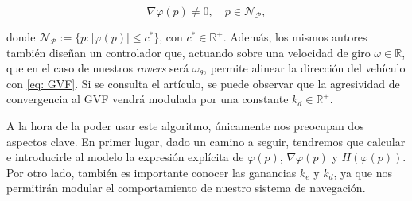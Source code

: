 \begin{equation} \label{eq: cond_regular}
    \nabla \varphi (p) \neq 0, \quad p\in \mathcal{N}_\mathcal{P},
\end{equation}

donde $\mathcal{N}_\mathcal{P} := \{p : |\varphi(p)| \leq c^*\}$, con $c^* \in \mathds{R^+}$. Además, los mismos autores también diseñan un controlador que, actuando sobre una velocidad de giro $\omega \in \mathds{R}$, que en el caso de nuestros \textit{rovers} será $\omega_{\theta}$, permite alinear la dirección del vehículo con \eqref{eq: GVF}. Si se consulta el artículo, se puede observar que la agresividad de convergencia al GVF vendrá modulada por una constante $k_d \in \mathds{R}^+$.

A la hora de la poder usar este algoritmo, únicamente nos preocupan dos aspectos clave. En primer lugar, dado un camino a seguir, tendremos que calcular e introducirle al modelo la expresión explícita de $\varphi(p)$, $\nabla\varphi(p)$ y $H(\varphi(p))$. Por otro lado, también es importante conocer las ganancias $k_e$ y $k_d$, ya que nos permitirán modular el comportamiento de nuestro sistema de navegación.

